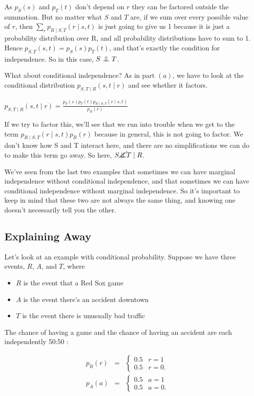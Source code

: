 \documentclass[6008notes.tex]{subfiles}
\begin{document}
As $p_S(s)$ and $p_T(t)$ don't depend on $r$ they can be factored outside the summation. But no matter what $S$ and $T$ are, if we sum over every possible value of $r$, then $\sum_r p_{R \mid S,T}(r \mid s,t)$ is just going to give us 1 because it is just a probability distribution over R, and all probability distributions have to sum to 1. Hence $p_{S,T}(s,t) = p_S(s) p_T(t)$, and that's exactly the condition for independence. So in this case, $S \bigCI T$. 

What about conditional independence? As in part $(a)$, we have to look at the conditional distribution $p_{S,T \mid R}(s,t \mid r)$ and see whether it factors.

{\centering$p_{S,T \mid R}(s,t \mid r) = \frac{p_S(s) p_T(t) p_{R \mid S,T}(r \mid s,t)}{p_R(r)}$ \par}

If we try to factor this, we'll see that we run into trouble when we get to the term $p_{R \mid S,T}(r \mid s,t){p_R(r)}$ because in general, this is not going to factor. We don't know how S and T interact here, and there are no simplifications we can do to make this term go away. So here, $S \nbigCI T \mid R$. 

We've seen from the last two examples that sometimes we can have marginal independence without conditional independence, and that sometimes we can have conditional independence without marginal independence. So it's important to keep in mind that these two are not always the same thing, and knowing one doesn't necessarily tell you the other.

\subsection{Explaining Away}

Let's look at an example with conditional probability. Suppose we have three events, $R$, $A$, and $T$, where
\begin{itemize}
\item $R$ is the event that a Red Sox game 
\item $A$ is the event there's an accident downtown
\item $T$ is the event there is unusually bad traffic
\end{itemize}

The chance of having a game and the chance of having an accident are each independently 50:50 : 

\begin{eqnarray*}
p_R(r)
&=&
\begin{cases}
0.5 & r=1\\
0.5 & r=0.
\end{cases} \\
p_A(a)
&=&
\begin{cases}
0.5 & a=1\\
0.5 & a=0.
\end{cases}
\end{eqnarray*}
\end{document}
